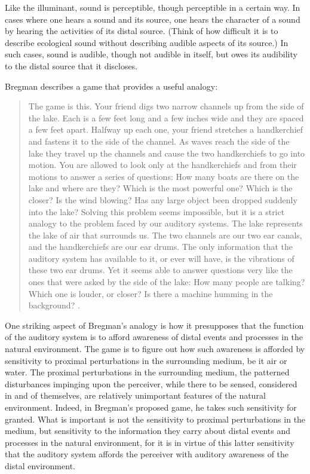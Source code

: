Like the illuminant, sound is perceptible, though perceptible in a certain way. In cases where one hears a sound and its source, one hears the character of a sound by hearing the activities of its distal source. (Think of how difficult it is to describe ecological sound without describing audible aspects of its source.) In such cases, sound is audible, though not audible in itself, but owes its audibility to the distal source that it discloses.

Bregman describes a game that provides a useful analogy:
\begin{quote}
	The game is this. Your friend digs two narrow channels up from the side of the lake. Each is a few feet long and a few inches wide and they are spaced a few feet apart. Halfway up each one, your friend stretches a handkerchief and fastens it to the side of the channel. As waves reach the side of the lake they travel up the channels and cause the two handkerchiefs to go into motion. You are allowed to look only at the handkerchiefs and from their motions to answer a series of questions: How many boats are there on the lake and where are they? Which is the most powerful one? Which is the closer? Is the wind blowing? Has any large object been dropped suddenly into the lake? Solving this problem seems impossible, but it is a strict analogy to the problem faced by our auditory systems. The lake represents the lake of air that surrounds us. The two channels are our two ear canals, and the handkerchiefs are our ear drums. The only information that the auditory system has available to it, or ever will have, is the vibrations of these two ear drums. Yet it seems able to answer questions very like the ones that were asked by the side of the lake: How many people are talking? Which one is louder, or closer? Is there a machine humming in the background? \citep[5--6]{Bregman:1990aa}.
\end{quote}

One striking aspect of Bregman's analogy is how it presupposes that the function of the auditory system is to afford awareness of distal events and processes in the natural environment. The game is to figure out how such awareness is afforded by sensitivity to proximal perturbations in the surrounding medium, be it air or water. The proximal perturbations in the surrounding medium, the patterned disturbances impinging upon the perceiver, while there to be sensed, considered in and of themselves, are relatively unimportant features of the natural environment. Indeed, in Bregman's proposed game, he takes such sensitivity for granted. What is important is not the sensitivity to proximal perturbations in the medium, but sensitivity to the information they carry about distal events and processes in the natural environment, for it is in virtue of this latter sensitivity that the auditory system affords the perceiver with auditory awareness of the distal environment.

